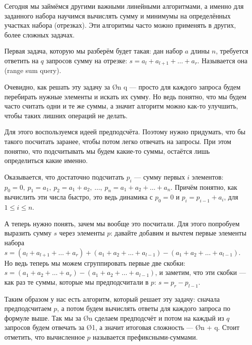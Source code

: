 Сегодня мы займёмся другими важными линейными алгоритмами, а именно для заданного набора научимся вычислять сумму и минимумы на определённых участках набора (отрезках). Эти алгоритмы часто можно применять в других, более сложных задачах.


Первая задача, которую мы разберём будет такая: дан набор $a$ длины $n$, требуется ответить на $q$ запросов сумму на отрезке: $s = a_l + a_{l + 1} + \ldots + a_r$. Называется она  (range sum query).

Очевидно, как решать эту задачу за \O{n \cdot q} — просто для каждого запроса будем перебирать нужные элементы и искать их сумму. Но ведь понятно, что мы будем часто считать одни и те же суммы, а значит алгоритм можно как-то улучшить, чтобы таких лишних операций не делать.

Для этого воспользуемся идеей предподсчёта. Поэтому нужно придумать, что бы такого посчитать заранее, чтобы потом легко отвечать на запросы. При этом понятно, что подсчитывать мы будем какие-то суммы, остаётся лишь определиться какие именно.

\begin{wrapping}{0.35}
	Оказывается, что достаточно подсчитать $p_i$ — сумму первых $i$ элементов: $p_0 = 0,\ p_1 = a_1,\ p_2 = a_1 + a_2,\ \ldots,\ p_n = a_1 + a_2 + \ldots + a_n$. Причём понятно, как вычислить эти числа быстро, это ведь динамика с $p_0 = 0$ и $p_i = p_{i - 1} + a_i$, для $1 \leq i \leq n$.
	
	А теперь нужно понять, зачем мы вообще это посчитали. Для этого попробуем выразить сумму $s$ через элементы $p$: давайте добавим и вычтем первые элементы набора $s = (a_l + a_{l + 1} + \ldots + a_{r}) + (a_1 + a_2 + \ldots + a_{l - 1}) - (a_1 + a_2 + \ldots + a_{l - 1})$. Но ведь теперь мы можем сгруппировать первые две скобки: $s = (a_1 + a_2 + \ldots + a_r) - (a_1 + a_2 + \ldots + a_{l - 1})$, и заметим, что эти скобки — как раз те суммы, которые мы предподсчитали в $p$: $s = p_r - p_{l - 1}$.
\end{wrapping}

Таким образом у нас есть алгоритм, который решает эту задачу: сначала предподсчитаем $p$, а потом будем вычислять ответы для каждого запроса по формуле выше. Так мы за \O{n} сделаем предподсчёт и потом на каждый из $q$ запросов будем отвечать за \O{1}, а значит итоговая сложность — \O{n + q}. Стоит отметить, что вычисленное $p$ называется префиксными-суммами.



